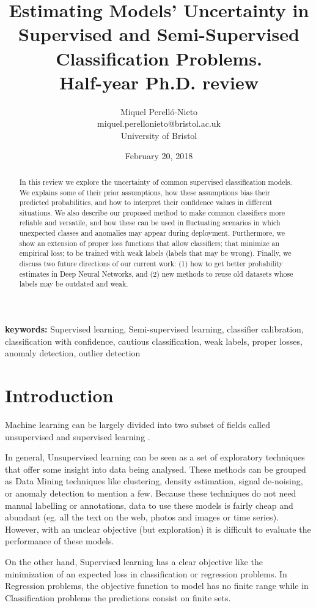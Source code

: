 \documentclass[a4paper, 12pt]{article}
\title{Estimating Models' Uncertainty in Supervised and Semi-Supervised Classification Problems. \\ Half-year Ph.D. review}
\author{Miquel Perelló-Nieto \\
miquel.perellonieto@bristol.ac.uk \\
University of Bristol}
\date{February 20, 2018}
\begin{document}
\maketitle

\begin{abstract}
In this review we explore the uncertainty of common supervised classification models.
We explains some of their prior assumptions, how these assumptions bias their predicted probabilities, and how to interpret their confidence values in different situations.
We also describe our proposed method to make common classifiers more reliable and versatile, and how these can be used in fluctuating scenarios in which unexpected classes and anomalies may appear during deployment.
Furthermore, we show an extension of proper loss functions that allow classifiers; that minimize an empirical loss; to be trained with weak labels (labels that may be wrong).
Finally, we discuss two future directions of our current work: (1) how to get better probability estimates in Deep Neural Networks, and (2) new methods to reuse old datasets whose labels may be outdated and weak.
\end{abstract}
\textbf{keywords:} Supervised learning, Semi-supervised learning, classifier calibration, classification with confidence, cautious classification, weak labels, proper losses, anomaly detection, outlier detection

\section{Introduction}

Machine learning can be largely divided into two subset of fields called unsupervised and supervised learning \cite{Bishop2006}.

In general, Unsupervised learning can be seen as a set of exploratory techniques that offer some insight into data being analysed.
These methods can be grouped as Data Mining techniques like clustering, density estimation, signal de-noising, or anomaly detection to mention a few.
Because these techniques do not need manual labelling or annotations, data to use these models is fairly cheap and abundant (eg. all the text on the web,  photos and images or time series).
However, with an unclear objective (but exploration) it is difficult to evaluate the performance of these models.

On the other hand, Supervised learning has a clear objective like the minimization of an expected loss in classification or regression problems.
In Regression problems, the objective function to model has no finite range while in Classification problems the predictions consist on finite sets.
\end{document}
